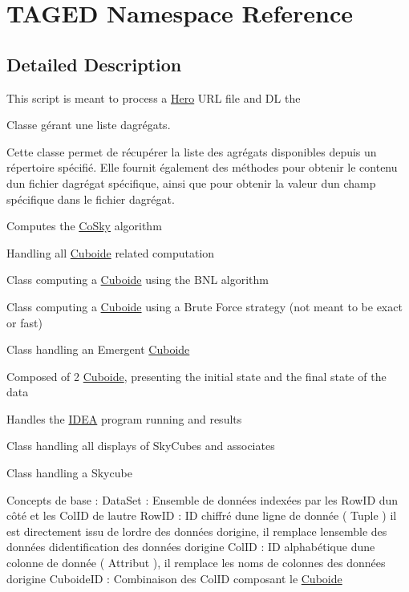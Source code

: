 \hypertarget{namespace_t_a_g_e_d}{}\section{T\+A\+G\+ED Namespace Reference}
\label{namespace_t_a_g_e_d}


\subsection{Detailed Description}
This script is meant to process a \hyperlink{class_hero}{Hero} U\+RL file and DL the 

Classe gérant une liste d\textquotesingle{}agrégats.

Cette classe permet de récupérer la liste des agrégats disponibles depuis un répertoire spécifié. Elle fournit également des méthodes pour obtenir le contenu d\textquotesingle{}un fichier d\textquotesingle{}agrégat spécifique, ainsi que pour obtenir la valeur d\textquotesingle{}un champ spécifique dans le fichier d\textquotesingle{}agrégat.

Computes the \hyperlink{class_co_sky}{Co\+Sky} algorithm 

Handling all \hyperlink{class_cuboide}{Cuboide} related computation 

Class computing a \hyperlink{class_cuboide}{Cuboide} using the B\+NL algorithm 

Class computing a \hyperlink{class_cuboide}{Cuboide} using a Brute Force strategy (not meant to be exact or fast) 

Class handling an Emergent \hyperlink{class_cuboide}{Cuboide}

Composed of 2 \hyperlink{class_cuboide}{Cuboide}, presenting the initial state and the final state of the data 

Handles the \hyperlink{class_i_d_e_a}{I\+D\+EA} program running and results 

Class handling all displays of Sky\+Cubes and associates 

Class handling a Skycube

Concepts de base \+: Data\+Set \+: Ensemble de données indexées par les Row\+ID d\textquotesingle{}un côté et les Col\+ID de l\textquotesingle{}autre Row\+ID \+: ID chiffré d\textquotesingle{}une ligne de donnée ( Tuple ) il est directement issu de l\textquotesingle{}ordre des données d\textquotesingle{}origine, il remplace l\textquotesingle{}ensemble des données d\textquotesingle{}identification des données d\textquotesingle{}origine Col\+ID \+: ID alphabétique d\textquotesingle{}une colonne de donnée ( Attribut ), il remplace les noms de colonnes des données d\textquotesingle{}origine Cuboide\+ID \+: Combinaison des Col\+ID composant le \hyperlink{class_cuboide}{Cuboide} 

